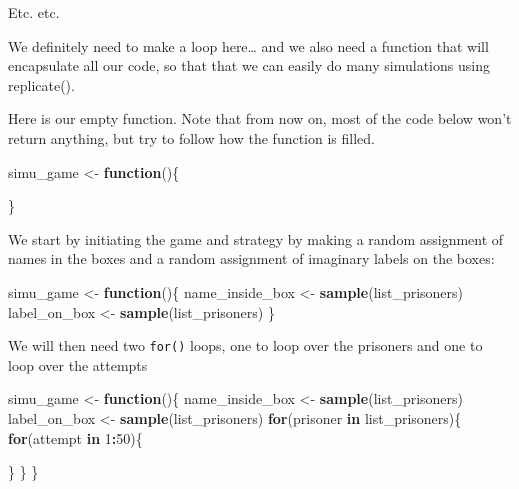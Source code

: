 \documentclass[]{book}
\newenvironment{Shaded}{\begin{snugshade}}{\end{snugshade}}
\newcommand{\ControlFlowTok}[1]{\textcolor[rgb]{0.13,0.29,0.53}{\textbf{#1}}}
\newcommand{\DecValTok}[1]{\textcolor[rgb]{0.00,0.00,0.81}{#1}}
\newcommand{\KeywordTok}[1]{\textcolor[rgb]{0.13,0.29,0.53}{\textbf{#1}}}
\newcommand{\NormalTok}[1]{#1}
\newcommand{\OperatorTok}[1]{\textcolor[rgb]{0.81,0.36,0.00}{\textbf{#1}}}
\newcommand{\StringTok}[1]{\textcolor[rgb]{0.31,0.60,0.02}{#1}}
\begin{document}
Etc. etc.

We definitely need to make a loop here\ldots{} and we also need a function that will encapsulate all our code, so that that we can easily do many simulations using replicate().

Here is our empty function. Note that from now on, most of the code below won't return anything, but try to follow how the function is filled.

\begin{Shaded}
\begin{Highlighting}[]
\NormalTok{simu_game <-}\StringTok{ }\ControlFlowTok{function}\NormalTok{()\{}

\NormalTok{\}}
\end{Highlighting}
\end{Shaded}

We start by initiating the game and strategy by making a random assignment of names in the boxes and a random assignment of imaginary labels on the boxes:

\begin{Shaded}
\begin{Highlighting}[]
\NormalTok{simu_game <-}\StringTok{ }\ControlFlowTok{function}\NormalTok{()\{}
\NormalTok{  name_inside_box <-}\StringTok{ }\KeywordTok{sample}\NormalTok{(list_prisoners)}
\NormalTok{  label_on_box <-}\StringTok{ }\KeywordTok{sample}\NormalTok{(list_prisoners)}
\NormalTok{\}}
\end{Highlighting}
\end{Shaded}

We will then need two \texttt{for()} loops, one to loop over the prisoners and one to loop over the attempts

\begin{Shaded}
\begin{Highlighting}[]
\NormalTok{simu_game <-}\StringTok{ }\ControlFlowTok{function}\NormalTok{()\{}
\NormalTok{  name_inside_box <-}\StringTok{ }\KeywordTok{sample}\NormalTok{(list_prisoners)}
\NormalTok{  label_on_box <-}\StringTok{ }\KeywordTok{sample}\NormalTok{(list_prisoners)}
  \ControlFlowTok{for}\NormalTok{(prisoner }\ControlFlowTok{in}\NormalTok{ list_prisoners)\{}
    \ControlFlowTok{for}\NormalTok{(attempt }\ControlFlowTok{in} \DecValTok{1}\OperatorTok{:}\DecValTok{50}\NormalTok{)\{}
      
\NormalTok{    \}}
\NormalTok{  \}}
\NormalTok{\}}
\end{Highlighting}
\end{Shaded}
\end{document}
